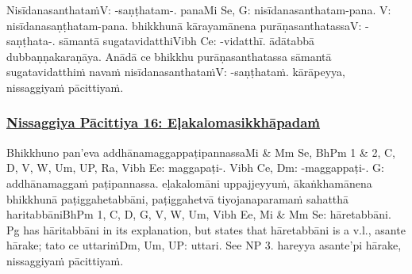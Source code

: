 Nisīdanasanthataṁ\makeatletter\hyperlink{endnote-appendix}\makeatother V: -saṇṭhatam-. pana\makeatletter\hyperlink{endnote-appendix}\makeatother Mi Se, G: nisīdanasanthatam-pana. V: nisīdanasaṇṭhatam-pana. bhikkhunā kārayamānena purāṇasanthatassa\makeatletter\hyperlink{endnote-appendix}\makeatother V: -saṇṭhata-. sāmantā sugatavidatthi\makeatletter\hyperlink{endnote-appendix}\makeatother Vibh Ce: -vidatthī. ādātabbā dubbaṇṇakaraṇāya. Anādā ce bhikkhu purāṇasanthatassa sāmantā sugatavidatthiṁ navaṁ nisīdanasanthataṁ\makeatletter\hyperlink{endnote-appendix}\makeatother V: -saṇṭhataṁ. kārāpeyya, nissaggiyaṁ pācittiyaṁ.



\subsubsection*{\hyperref[forf-exp16]{Nissaggiya Pācittiya 16: Eḷakalomasikkhāpadaṁ}}
\label{np16}

Bhikkhuno pan'eva addhānamaggappaṭipannassa\makeatletter\hyperlink{endnote-appendix}\makeatother Mi & Mm Se, BhPm 1 & 2, C, D, V, W, Um, UP, Ra, Vibh Ee: maggapaṭi-. Vibh Ce, Dm: -maggappaṭi-. G: addhānamaggaṁ
paṭipannassa. eḷakalomāni uppajjeyyuṁ, ākaṅkhamānena bhikkhunā paṭiggahetabbāni, paṭiggahetvā tiyojanaparamaṁ sahatthā haritabbāni\makeatletter\hyperlink{endnote-appendix}\makeatother BhPm 1, C, D, G, V, W, Um, Vibh Ee, Mi & Mm Se:  hāretabbāni. Pg has  hāritabbāni in its explanation, but states that
hāretabbāni is a v.l., asante hārake; tato ce uttariṁ\makeatletter\hyperlink{endnote-appendix}\makeatother Dm, Um, UP: uttari. See NP 3. hareyya asante'pi hārake, nissaggiyaṁ pācittiyaṁ.



